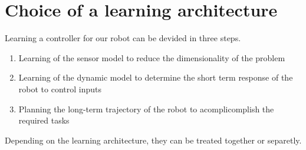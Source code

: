 \section{Choice of a learning architecture}

Learning a controller for our robot can be devided in three steps.
\begin{enumerate}
 \item Learning of the sensor model to reduce the dimensionality of the problem
 \item Learning of the dynamic model to determine the short term response of the robot to control inputs
 \item Planning the long-term trajectory of the robot to acomplicomplish the required tasks
\end{enumerate}
Depending on the learning architecture, they can be treated together or separetly. 
